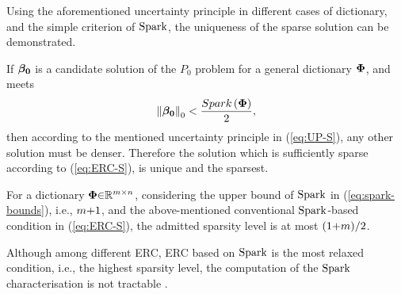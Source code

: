 Using the aforementioned uncertainty principle in different cases of dictionary, and the simple criterion of $\mathrm{Spark}$, the uniqueness of the sparse solution can be demonstrated. 

If $\boldsymbol{\beta_0}$ is a candidate solution of the $P_0$ problem for a general dictionary $\boldsymbol{\Phi}$, and meets
\begin{equation}
\label{eq:ERC-S}
\left\lVert\boldsymbol{\beta_0}\right\rVert_0 < \frac{Spark\left( \boldsymbol{\Phi} \right)}{2},
\end{equation}
then according to the mentioned uncertainty principle in (\ref{eq:UP-S}), any other solution must be denser. Therefore the solution which is sufficiently sparse according to (\ref{eq:ERC-S}), is unique and the sparsest.

For a dictionary $\boldsymbol{\Phi} {\in} \mathbb{R}^{m {\times} n}$, considering the upper bound of $\mathrm{Spark}$ in (\ref{eq:spark-bounds}), i.e., $m {+} 1$, and the above-mentioned conventional $\mathrm{Spark}$-based condition in (\ref{eq:ERC-S}), the admitted sparsity level is at most $(1 {+} m)/2$.

Although among different ERC, ERC based on $\mathrm{Spark}$ is the most relaxed condition, i.e., the highest sparsity level, the computation of the $\mathrm{Spark}$ characterisation is not tractable \cite{Tillmann2013}.